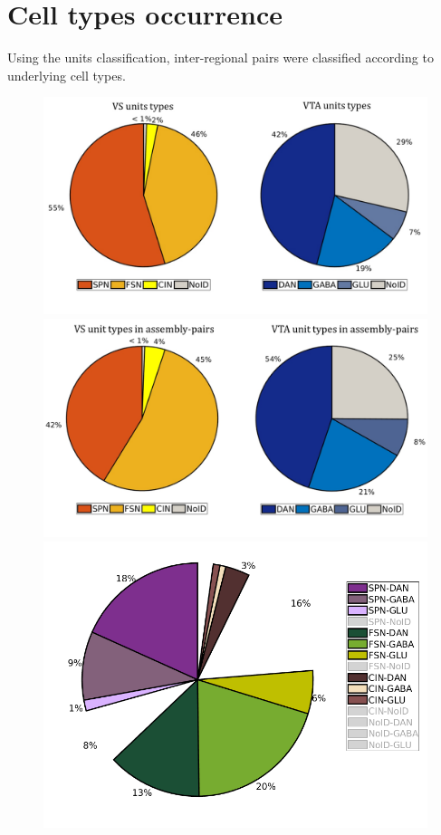 \section{Cell types occurrence}
Using the units classification, inter-regional pairs were classified according to underlying cell types. 
\begin{figure}[H]
    \centering
    \includegraphics[scale=0.35]{figures/PieRegions1.pdf}
    \includegraphics[scale=0.35]{figures/PieAsNotAs.pdf}
    \includegraphics[scale=0.35]{figures/PieAssembliesTot1.png}

\end{figure}

